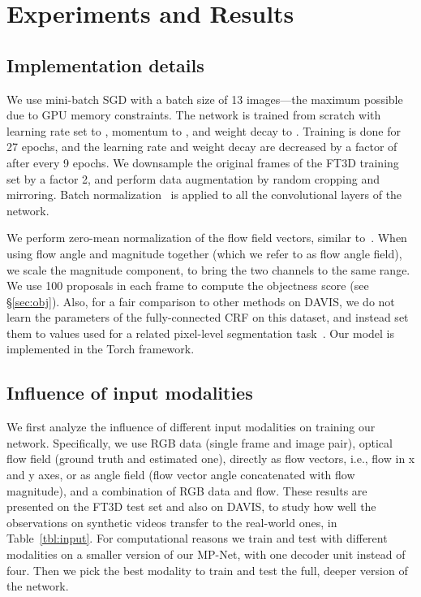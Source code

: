 \documentclass[10pt,twocolumn,letterpaper]{article}
\begin{document}
\vspace{-0.2cm}
\section{Experiments and Results}
\label{sec:expts}

\vspace{-0.16cm}
\subsection{Implementation details}
\label{sec:implement}
\vspace{-0.1cm}
 We use mini-batch SGD with a batch size of 13
images---the maximum possible due to GPU memory constraints. The network is
trained from scratch with learning rate set to , momentum to , and
weight decay to . Training is done for 27 epochs, and the learning rate
and weight decay are decreased by a factor of  after every 9 epochs. We
downsample the original frames of the FT3D training set by a factor 2, and
perform data augmentation by random cropping and mirroring. Batch
normalization~\cite{ioffe2015batch} is applied to all the convolutional layers
of the network.

\vspace{0.06cm}
 We perform zero-mean normalization of the flow
field vectors, similar to~\cite{simonyan2014two}. When using flow angle and
magnitude together (which we refer to as flow angle field), we scale the
magnitude component, to bring the two channels to the same range. We use 100
proposals in each frame to compute the objectness score (see \S\ref{sec:obj}).
Also, for a fair comparison to other methods on DAVIS, we do not learn the
parameters of the fully-connected CRF on this dataset, and instead set them to
values used for a related pixel-level segmentation
task~\cite{chen2014semantic}. Our model is implemented in the Torch framework.

\vspace{-0.1cm}
\subsection{Influence of input modalities}
\label{sec:mod}
\vspace{-0.15cm}
We first analyze the influence of different input modalities on training our
network. Specifically, we use RGB data (single frame and image pair), optical
flow field (ground truth and estimated one), directly as flow vectors, i.e.,
flow in x and y axes, or as angle field (flow vector angle concatenated with
flow magnitude), and a combination of RGB data and flow. These results are
presented on the FT3D test set and
also on DAVIS, to study how well the observations on synthetic videos transfer
to the real-world ones, in Table~\ref{tbl:input}. For computational reasons we
train and test with different modalities on a smaller version of our MP-Net,
with one decoder unit instead of four. Then we pick the best modality to train
and test the full, deeper version of the network.
\end{document}
